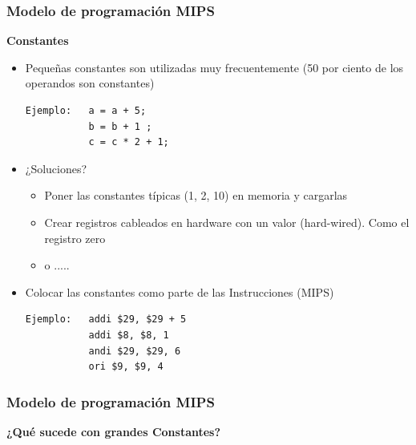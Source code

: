\documentclass[aspectratio=169,compress]{beamer}
\begin{document}
\begin{footnotesize}
\begin{frame}
\begin{center}
        \end{center}
\end{frame}


\begin{frame}[fragile]
\frametitle{Modelo de programación MIPS}
\begin{center}\textbf{Constantes}\end{center}

\begin{itemize}
\item Pequeñas constantes son utilizadas muy frecuentemente (50 por ciento de los operandos son constantes)
\begin{verbatim}
Ejemplo:   a = a + 5;
           b = b + 1 ;
           c = c * 2 + 1;
\end{verbatim}
\item ¿Soluciones? 
\begin{itemize}
\item Poner las constantes típicas (1, 2, 10) en memoria y cargarlas
\item Crear registros cableados en hardware con un valor (hard-wired). Como el registro zero
\item o .....
\end{itemize}
\item Colocar las constantes como parte de las Instrucciones (MIPS)
\begin{verbatim}
Ejemplo:   addi $29, $29 + 5
           addi $8, $8, 1
           andi $29, $29, 6
           ori $9, $9, 4
\end{verbatim}
\end{itemize}
\end{frame}




\begin{frame}[fragile]
\frametitle{Modelo de programación MIPS}
\begin{center}\textbf{¿Qué sucede con grandes Constantes?}\end{center}


\end{frame}
\end{footnotesize}
\end{document}
